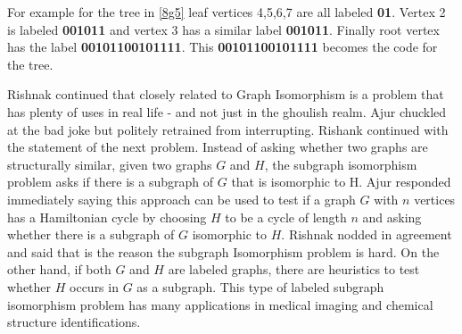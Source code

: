 For example for the tree in \ref{8g5} leaf vertices 4,5,6,7 are all labeled \textbf{01}. Vertex 2 is labeled \textbf{001011} and vertex 3 has a similar label \textbf{001011}. Finally root vertex has the label \textbf{00101100101111}. This \textbf{00101100101111} becomes the code for the tree.

Rishnak continued that closely related to Graph Isomorphism is a problem that has plenty of uses in real life - and not just in the ghoulish realm. Ajur chuckled at the bad joke but politely retrained from interrupting. Rishank continued with the statement of the next problem.  Instead of asking whether two graphs are structurally similar, given two graphs $G$ and $H$, the subgraph isomorphism problem asks if there is a subgraph of $G$ that is isomorphic to H. Ajur responded immediately saying this approach can be used to test if a graph $G$ with $n$ vertices has a Hamiltonian cycle by choosing $H$ to be a cycle of length $n$ and asking whether there is a subgraph of $G$ isomorphic to $H$. Rishnak nodded in agreement and said that is the reason the subgraph Isomorphism problem is hard. On the other hand, if both $G$ and $H$ are labeled graphs, there are heuristics to test whether $H$ occurs in $G$ as a subgraph. This type of labeled subgraph isomorphism problem has many applications in medical imaging and chemical structure identifications.

